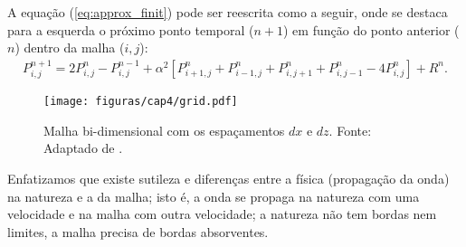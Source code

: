 A equação (\ref{eq:approx_finit}) pode ser reescrita como a seguir, onde se destaca para a esquerda o próximo ponto temporal ($n+1$) em função do ponto anterior ($n$) dentro da malha ($i,j$):
\begin{eqnarray}
P^{n+1}_{i,j}=2P^{n}_{i,j}-P^{n-1}_{i,j}+\alpha^2[P^{n}_{i+1,j}+P^{n}_{i-1,j}+P^{n}_{i,j+1}+P^{n}_{i,j-1}-4P^{n}_{i,j}]+R^{n}.
\label{eq:approx_finit_1}
\end{eqnarray}

\begin{figure}[H]
\centering
\texttt{[image: figuras/cap4/grid.pdf]}
\caption{Malha bi-dimensional com os espaçamentos $dx$ e $dz$. Fonte: Adaptado de \cite{Bording(1997)}.}
\label{fig:grid}
\end{figure}

Enfatizamos que existe sutileza e diferenças entre a física (propagação da onda) na natureza e a da malha; isto é, a onda se propaga na natureza com uma velocidade e na malha com outra velocidade; a natureza não tem bordas nem limites, a malha precisa de bordas absorventes.

